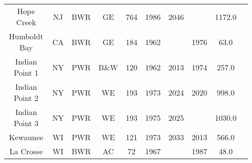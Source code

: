 \begin{table}[h!]
\begin{tabular}{c c c c c c c c c c}
    Hope Creek & NJ & BWR & GE & 764 & 1986 & 2046 &  & 1172.0 \\
    Humboldt Bay & CA & BWR & GE & 184 & 1962 &  & 1976 & 63.0 \\
    Indian Point 1 & NY & PWR & B\&W & 120 & 1962 & 2013 & 1974 & 257.0 \\
    Indian Point 2 & NY & PWR & WE & 193 & 1973 & 2024 & 2020 & 998.0 \\
    Indian Point 3 & NY & PWR & WE & 193 & 1975 & 2025 &  & 1030.0 \\
    Kewaunee & WI & PWR & WE & 121 & 1973 & 2033 & 2013 & 566.0 \\
    La Crosse & WI & BWR & AC & 72 & 1967 &  & 1987 & 48.0 \\
    \hline
    \end{tabular}
\end{table}

